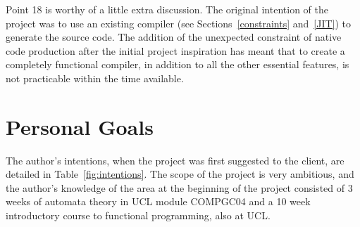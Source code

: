 \documentclass[12pt, a4paper]{report}
\begin{document}
Point 18 is worthy of a little extra discussion. The original intention of the project was to use
an existing compiler (see Sections~\ref{constraints} and~\ref{JIT}) to generate the source code.
The addition of the unexpected constraint of native code production after the initial project
inspiration has meant that to create a completely functional compiler, in addition to all the other
essential features, is not practicable within the time available.

\section{Personal Goals}
\label{personal}
The author's intentions, when the project was first suggested to the client, are detailed in
Table~\ref{fig:intentions}. The scope of the project is very ambitious, and the author's knowledge
of the area at the beginning of the project consisted of 3 weeks of automata theory in UCL module
COMPGC04 and a 10 week introductory course to functional programming, also at UCL. 
\end{document}
